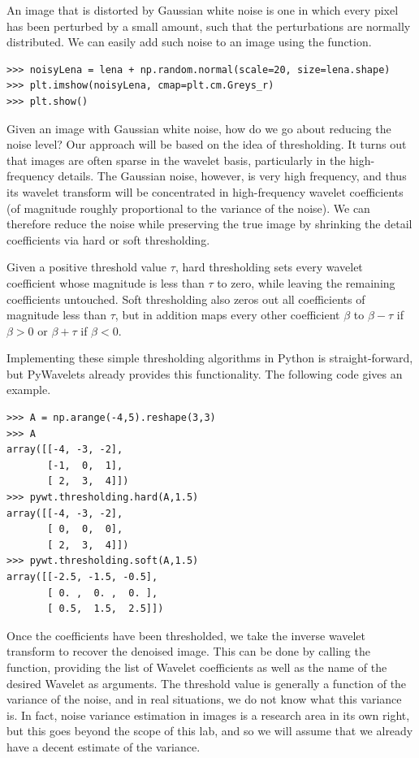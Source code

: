 An image that is distorted by Gaussian white noise is one in which
every pixel has been perturbed by a small amount, such that the
perturbations are normally distributed. We can easily add such noise
to an image using the  function.

\begin{lstlisting}
>>> noisyLena = lena + np.random.normal(scale=20, size=lena.shape)
>>> plt.imshow(noisyLena, cmap=plt.cm.Greys_r)
>>> plt.show()
\end{lstlisting}

Given an image with Gaussian white noise, how do we go about reducing
the noise level? Our approach will be based on the idea of thresholding.
It turns out that images are often sparse in the wavelet basis,
particularly in the high-frequency details. The Gaussian noise, however,
is very high frequency, and thus its wavelet transform will be
concentrated in high-frequency wavelet coefficients (of magnitude
roughly proportional to the variance of the noise). We can therefore
reduce the noise while preserving the true image by shrinking the
detail coefficients via hard or soft thresholding.

Given a positive threshold value $\tau$, hard thresholding sets
every wavelet coefficient whose magnitude is less than $\tau$ to
zero, while leaving the remaining coefficients untouched. Soft
thresholding also zeros out all coefficients of magnitude less than
$\tau$, but in addition maps every other coefficient $\beta$ to
$\beta - \tau$ if $\beta > 0$ or $\beta + \tau$ if $\beta < 0$.

Implementing these simple thresholding algorithms in Python is 
straight-forward, but PyWavelets already provides this functionality.
The following code gives an example.

\begin{lstlisting}
>>> A = np.arange(-4,5).reshape(3,3)
>>> A
array([[-4, -3, -2],
       [-1,  0,  1],
       [ 2,  3,  4]])
>>> pywt.thresholding.hard(A,1.5)
array([[-4, -3, -2],
       [ 0,  0,  0],
       [ 2,  3,  4]])
>>> pywt.thresholding.soft(A,1.5)
array([[-2.5, -1.5, -0.5],
       [ 0. ,  0. ,  0. ],
       [ 0.5,  1.5,  2.5]])
\end{lstlisting}

Once the coefficients have been thresholded, we take the inverse
wavelet transform to recover the denoised image. This can be done
by calling the  function, providing the list of Wavelet
coefficients as well as the name of the desired Wavelet as arguments.
The threshold value is generally a function of the variance of the noise,
and in real situations, we do not know what this variance is. In fact,
noise variance estimation in images is a research area in its own
right, but this goes beyond the scope of this lab, and so we will
assume that we already have a decent estimate of the variance.

